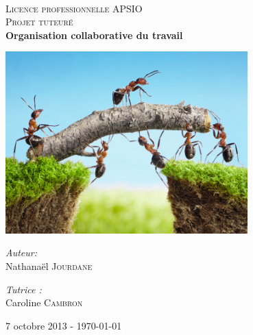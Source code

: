 \begin{titlepage}
\begin{center}

~\\[3cm]
\textsc{\LARGE Licence professionnelle APSIO}\\[1cm]

\textsc{\Large Projet tuteuré}\\[1.5cm]

{ \huge \bfseries Organisation collaborative du travail \\[2cm] }

\includegraphics[width=0.7\textwidth]{img/collaborative_ants.png}~\\[1cm]

\begin{minipage}{0.4\textwidth}
\begin{flushleft} \large
\emph{Auteur:}\\
Nathanaël \textsc{Jourdane}
\end{flushleft}
\end{minipage}
\begin{minipage}{0.4\textwidth}
\begin{flushright} \large
\emph{Tutrice :} \\
Caroline \textsc{Cambron}
\end{flushright}
\end{minipage}

\vfill

{\large 7 octobre 2013 - \today}

\end{center}
\end{titlepage}

\newpage \strut \newpage \pagestyle{fancyplain}
